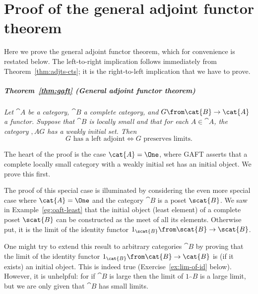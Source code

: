 \chapter{Proof of the general adjoint functor theorem}
%
%
%

Here we prove the general adjoint functor theorem, which for convenience is
restated below.  The left-to-right implication follows immediately from
Theorem~\ref{thm:adjts-cts}; it is the right-to-left implication that we
have to prove.

\paragraph*{\upshape Theorem~\ref{thm:gaft} (General adjoint functor theorem)} 
{\itshape
Let $\cat{A}$ be a category, $\cat{B}$ a complete category, and $G\from
\cat{B} \to \cat{A}$ a functor.  Suppose that $\cat{B}$ is locally small and
that for each $A \in \cat{A}$, the category $\comma{A}{G}$ has a weakly%
%
%
%
initial set.  Then
\[
G \text{ has a left adjoint}
\iff
G \text{ preserves limits}.
\]
}

The heart of the proof is the case $\cat{A} = \One$, where GAFT asserts
that a complete locally small category with a weakly initial set has an
initial object.  We prove this first.

The proof of this special case is illuminated by considering the even more
special case where $\cat{A} = \One$ and the category $\cat{B}$ is a poset
$\scat{B}$.  We saw in Example~\ref{eg:oaft-least} that the initial object
(least%
%
%
element) of a complete poset $\scat{B}$ can be constructed as the meet of
all its elements.  Otherwise put, it is the limit of the identity functor
$1_\scat{B}\from \scat{B} \to \scat{B}$.

One might try to extend this result to arbitrary categories $\cat{B}$ by
proving that the limit of the identity%
%
%
%
%
functor $1_\cat{B}\from \cat{B} \to \cat{B}$ is (if it exists) an initial
object.  This is indeed true (Exercise~\ref{ex:lim-of-id} below).  However,
it is unhelpful: for if $\cat{B}$ is large then the limit of $1_\cat{B}$
is a large%
%
%
limit, but we are only given that $\cat{B}$ has small limits.

